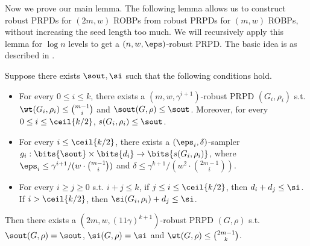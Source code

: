 \noindent
Now we prove our main lemma. The following lemma allows us to construct robust PRPDs for $(2m,w)$ ROBPs from robust PRPDs for $(m,w)$ ROBPs, without increasing the seed length too much. We will recursively apply this lemma for $\log n$ levels to get a $(n,w,\eps)$-robust PRPD. The basic idea is as described in .
\begin{lemma}\label{lemma:main-approx}
Suppose there exists $\sout,\si$ such that the following conditions hold.
\begin{itemize}
\item
For every $0\le i\le k$, there exists a $(m,w,\gamma^{i+1})$-robust PRPD $(G_i,\rho_i)$ s.t. $\wt(G_i,\rho_i)\le \binom{m-1}{i}$ and $\sout(G,\rho)\le \sout$. Moreover, for every $0\le i\le \ceil{k/2}$, $s(G_i,\rho_i) \le \sout$.
\item
For every $i\le \ceil{k/2}$, there exists a $(\eps_i,\delta)$-sampler $g_i:\bits{\sout}\times\bits{d_i}\to\bits{s(G_i,\rho_i)}$, where $\eps_i\le \gamma^{i+1}/(w\cdot\binom{m-1}{i})$ and $\delta\le \gamma^{k+1}/(w^2\cdot \binom{2m-1}{i})$.
\item
For every $i\ge j\ge 0$ s.t. $i+j\le k$, if $j\le i\le \ceil{k/2}$, then $d_i+d_j\le \si$. If $i>\ceil{k/2}$, then $\si(G_i,\rho_i)+d_j\le \si $.
\end{itemize}
Then there exists a $(2m,w,(11\gamma)^{k+1})$-robust PRPD $(G,\rho)$ s.t. $\sout(G,\rho)=\sout$, $\si(G,\rho)=\si$ and $\wt(G,\rho)\le \binom{2m-1}{k}$.
\end{lemma}

